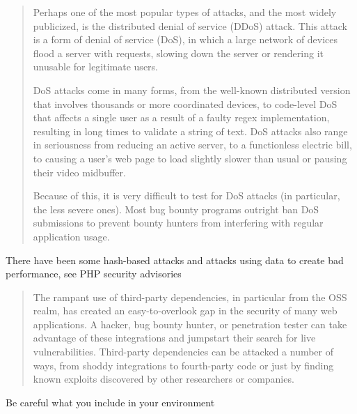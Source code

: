 \documentclass[Screen16to9,17pt]{foils}
\begin{document}
\begin{quote}
Perhaps one of the most popular types of attacks, and the most widely publicized, is the distributed denial of service (DDoS) attack. This attack is a form of denial of service (DoS), in which a large network of devices flood a server with requests, slowing down the server or rendering it unusable for legitimate users.

DoS attacks come in many forms, from the well-known distributed version that involves thousands or more coordinated devices, to code-level DoS that affects a single user as a result of a faulty regex implementation, resulting in long times to validate a string of text. DoS attacks also range in seriousness from reducing an active server, to a functionless electric bill, to causing a user’s web page to load slightly slower than usual or pausing their video midbuffer.

Because of this, it is very difficult to test for DoS attacks (in particular, the less severe
ones). Most bug bounty programs outright ban DoS submissions to prevent bounty
hunters from interfering with regular application usage.
\end{quote}

\begin{list2}
\item There have been some hash-based attacks and attacks using data to create bad performance, see PHP security advisories
\end{list2}


\begin{quote}
The rampant use of third-party dependencies, in particular from the OSS realm, has created an easy-to-overlook gap in the security of many web applications. A hacker, bug bounty hunter, or penetration tester can take advantage of these integrations and jumpstart their search for live vulnerabilities. Third-party dependencies can be attacked a number of ways, from shoddy integrations to fourth-party code or just by finding known exploits discovered by other researchers or companies.
\end{quote}

\begin{list2}
  \item Be careful what you include in your environment
\end{list2}


\end{document}
